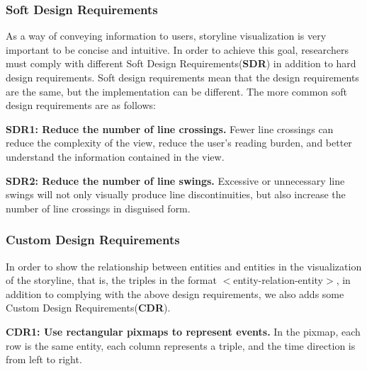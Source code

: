 \subsubsection{Soft Design Requirements}
\noindent As a way of conveying information to users, storyline visualization is very important to be concise and intuitive. In order to achieve this goal, researchers must comply with different Soft Design Requirements(\textbf{SDR}) in addition to hard design requirements. Soft design requirements mean that the design requirements are the same, but the implementation can be different. The more common soft design requirements are as follows:  

  \textbf{SDR1: Reduce the number of line crossings.} Fewer line crossings can reduce the complexity of the view, reduce the user's reading burden, and better understand the information contained in the view.

  \textbf{SDR2: Reduce the number of line swings.} Excessive or unnecessary line swings will not only visually produce line discontinuities, but also increase the number of line crossings in disguised form.

\subsubsection{Custom Design Requirements}
\noindent In order to show the relationship between entities and entities in the visualization of the storyline, that is, the triples in the format $<$entity-relation-entity$>$, in addition to complying with the above design requirements, we also adds some Custom Design Requirements(\textbf{CDR}).

  \textbf{CDR1: Use rectangular pixmaps to represent events.} In the pixmap, each row is the same entity, each column represents a triple, and the time direction is from left to right.

